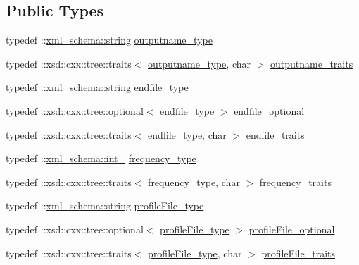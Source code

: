 \subsection*{Public Types}
\begin{DoxyCompactItemize}
\item 
typedef \+::\hyperlink{namespacexml__schema_ac0cec83a330f0024e4e318b3deac5104}{xml\+\_\+schema\+::string} \hyperlink{classsetting__t_a176d76dc9ab1b149c679035ce0aa5448}{outputname\+\_\+type}
\item 
typedef \+::xsd\+::cxx\+::tree\+::traits$<$ \hyperlink{classsetting__t_a176d76dc9ab1b149c679035ce0aa5448}{outputname\+\_\+type}, char $>$ \hyperlink{classsetting__t_ae26e11d5332e659cec4e08d78cd65bbd}{outputname\+\_\+traits}
\item 
typedef \+::\hyperlink{namespacexml__schema_ac0cec83a330f0024e4e318b3deac5104}{xml\+\_\+schema\+::string} \hyperlink{classsetting__t_a395877994cdfcf2ea063a56aed90cf01}{endfile\+\_\+type}
\item 
typedef \+::xsd\+::cxx\+::tree\+::optional$<$ \hyperlink{classsetting__t_a395877994cdfcf2ea063a56aed90cf01}{endfile\+\_\+type} $>$ \hyperlink{classsetting__t_a38dbb691ee80d982dc24fd1b3e514f1e}{endfile\+\_\+optional}
\item 
typedef \+::xsd\+::cxx\+::tree\+::traits$<$ \hyperlink{classsetting__t_a395877994cdfcf2ea063a56aed90cf01}{endfile\+\_\+type}, char $>$ \hyperlink{classsetting__t_a0c2240e9363329e936e3ba35fa9ec642}{endfile\+\_\+traits}
\item 
typedef \+::\hyperlink{namespacexml__schema_acfa24ac68e1a188e7f44c36f7a158bf4}{xml\+\_\+schema\+::int\+\_\+} \hyperlink{classsetting__t_af0353930c8d9e0e19ee57943f2d130ee}{frequency\+\_\+type}
\item 
typedef \+::xsd\+::cxx\+::tree\+::traits$<$ \hyperlink{classsetting__t_af0353930c8d9e0e19ee57943f2d130ee}{frequency\+\_\+type}, char $>$ \hyperlink{classsetting__t_a948d945ce65d7779e6820f6de48d0613}{frequency\+\_\+traits}
\item 
typedef \+::\hyperlink{namespacexml__schema_ac0cec83a330f0024e4e318b3deac5104}{xml\+\_\+schema\+::string} \hyperlink{classsetting__t_afaef422486c04366dea99f1c838feb59}{profile\+File\+\_\+type}
\item 
typedef \+::xsd\+::cxx\+::tree\+::optional$<$ \hyperlink{classsetting__t_afaef422486c04366dea99f1c838feb59}{profile\+File\+\_\+type} $>$ \hyperlink{classsetting__t_a9fc7a23427369cf0af6e4521b9e88d64}{profile\+File\+\_\+optional}
\item 
typedef \+::xsd\+::cxx\+::tree\+::traits$<$ \hyperlink{classsetting__t_afaef422486c04366dea99f1c838feb59}{profile\+File\+\_\+type}, char $>$ \hyperlink{classsetting__t_af0663c89478aa719ca80575a0f8f0585}{profile\+File\+\_\+traits}

\end{DoxyCompactItemize}
